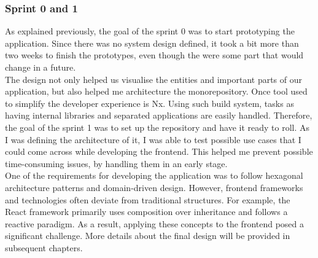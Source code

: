 \documentclass[../memory.tex]{subfiles}
\begin{document}
\subsubsection{Sprint 0 and 1}
As explained previously, the goal of the sprint 0 was to start prototyping the
application. Since there was no system design defined, it took a bit more than
two weeks to finish the prototypes, even though the were some part that would
change in a future.
\\
The design not only helped us visualise the entities and important parts of our
application, but also helped me architecture the monorepository. Once tool used
to simplify the developer experience is Nx. Using such build system, tasks as
having internal libraries and separated applications are easily handled.
Therefore, the goal of the sprint 1 was to set up the repository and have it
ready to roll. As I was defining the architecture of it, I was able to test
possible use cases that I could come across while developing the frontend. This
helped me prevent possible time-consuming issues, by handling them in an early
stage.
\\
One of the requirements for developing the application was to follow hexagonal
architecture patterns and domain-driven design. However, frontend frameworks and
technologies often deviate from traditional structures. For example, the React
framework primarily uses composition over inheritance and follows a reactive
paradigm. As a result, applying these concepts to the frontend posed a
significant challenge. More details about the final design will be provided in
subsequent chapters.
\end{document}
